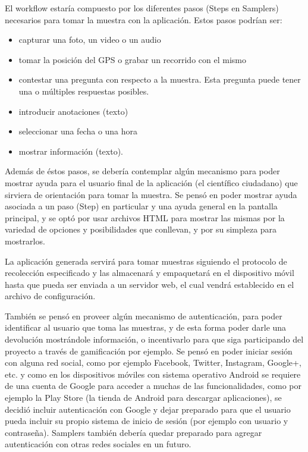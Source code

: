 El workflow estaría compuesto por los diferentes pasos (Steps en Samplers) necesarios para tomar la muestra con la aplicación. Estos pasos podrían ser:
\begin{itemize}
\item capturar una foto, un video o un audio
\item tomar la posición del GPS o grabar un recorrido con el mismo
\item contestar una pregunta con respecto a la muestra. Esta pregunta puede tener una o múltiples respuestas posibles.
\item introducir anotaciones (texto)
\item seleccionar una fecha o una hora
\item mostrar información (texto).
\end{itemize}

Además de éstos pasos, se debería contemplar algún mecanismo para poder mostrar ayuda para el usuario final de la aplicación (el científico ciudadano) que sirviera de orientación para tomar la muestra. Se pensó en poder mostrar ayuda asociada a un paso (Step) en particular y una ayuda general en la pantalla principal, y se optó por usar archivos HTML para mostrar las mismas por la variedad de opciones y posibilidades que conllevan, y por su simpleza para mostrarlos.

La aplicación generada servirá para tomar muestras siguiendo el protocolo de recolección especificado y las almacenará y empaquetará en el dispositivo móvil hasta que pueda ser enviada a un servidor web, el cual vendrá establecido en el archivo de configuración.

También se pensó en proveer algún mecanismo de autenticación, para poder identificar al usuario que toma las muestras, y de esta forma poder darle una devolución mostrándole información, o incentivarlo para que siga participando del proyecto a través de gamificación por ejemplo.
Se pensó en poder iniciar sesión con alguna red social, como por ejemplo Facebook, Twitter, Instagram, Google+, etc. y como en los dispositivos móviles con sistema operativo Android se requiere de una cuenta de Google para acceder a muchas de las funcionalidades, como por ejemplo la Play Store (la tienda de Android para descargar aplicaciones), se decidió incluir autenticación con Google y dejar preparado para que el usuario pueda incluir su propio sistema de inicio de sesión (por ejemplo con usuario y contraseña). Samplers también debería quedar preparado para agregar autenticación con otras redes sociales en un futuro.

